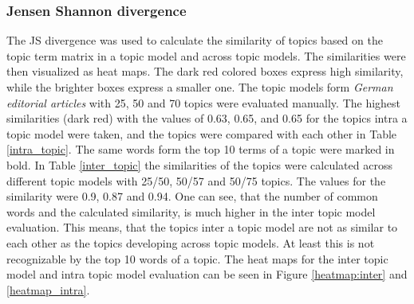 \subsubsection{Jensen Shannon divergence}
The \ac{JS} divergence was used to calculate the similarity of topics based on the topic term matrix in a topic model and across topic models. The similarities were then visualized as heat maps. The dark red colored boxes express high similarity, while the brighter boxes express a smaller one. 
The topic models form \textit{German editorial articles} with 25, 50 and 70 topics were evaluated manually. The highest similarities (dark red) with the values of 0.63, 0.65, and 0.65 for the topics intra a topic model were taken, and the topics were compared with each other in Table \ref{intra_topic}. The same words form the top 10 terms of a topic were marked in bold. In Table \ref{inter_topic} the similarities of the topics were calculated across different topic models with 25/50, 50/57 and 50/75 topics. The values for the similarity were 0.9, 0.87 and 0.94. One can see, that the number of common words and the calculated similarity, is much higher in the inter topic model evaluation. This means, that the topics inter a topic model are not as similar to each other as the topics developing across topic models. At least this is not recognizable by the top 10 words of a topic. The heat maps for the inter topic model and intra topic model evaluation can be seen in Figure \ref{heatmap:inter} and \ref{heatmap_intra}.





